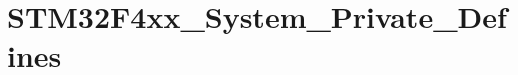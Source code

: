 \hypertarget{group___s_t_m32_f4xx___system___private___defines}{\section{S\-T\-M32\-F4xx\-\_\-\-System\-\_\-\-Private\-\_\-\-Defines}
\label{group___s_t_m32_f4xx___system___private___defines}
}
